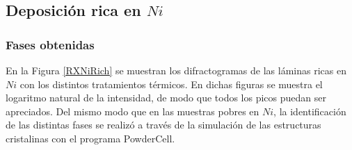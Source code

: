 \documentclass[12pt]{article}
\theoremstyle{definition}
\theoremstyle{remark}
\begin{document}
{\subsection{Deposición rica en $Ni$}
\subsubsection{Fases obtenidas}
En la Figura \ref{RXNiRich} se muestran los difractogramas de las láminas ricas en $Ni$ con los distintos tratamientos térmicos. En dichas figuras se muestra el logaritmo natural de la intensidad, de modo que todos los picos puedan ser apreciados. Del mismo modo que en las muestras pobres en $Ni$, la identificación de las distintas fases se realizó a través de la simulación de las estructuras cristalinas con el programa PowderCell.

}
\end{document}
